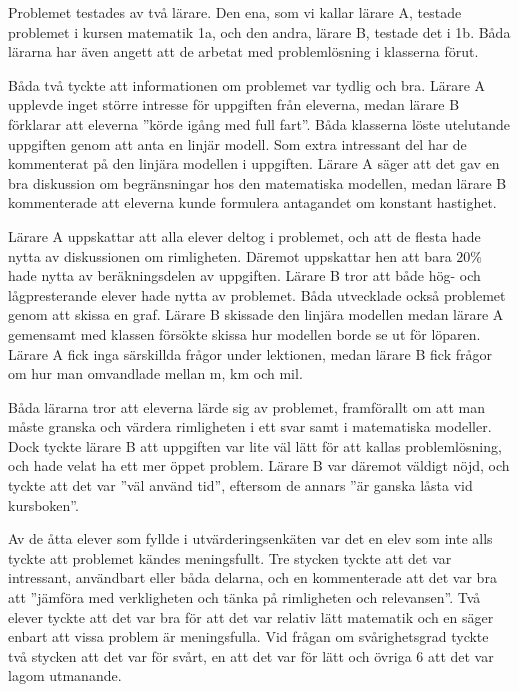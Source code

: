         \textcolor{lila}{Problemet testades av två lärare. Den ena, som vi kallar lärare A, testade problemet i kursen matematik 1a, och den andra, lärare B, testade det i 1b. Båda lärarna har även angett att de arbetat med problemlösning i klasserna förut.}
    
        \textcolor{lila}{Båda två tyckte att informationen om problemet var tydlig och bra. Lärare A upplevde inget större intresse för uppgiften från eleverna, medan lärare B förklarar att eleverna ''körde igång med full fart''. Båda klasserna löste utelutande uppgiften genom att anta en linjär modell. Som extra intressant del har de kommenterat på den linjära modellen i uppgiften. Lärare A säger att det gav en bra diskussion om begränsningar hos den matematiska modellen, medan lärare B kommenterade att eleverna kunde formulera antagandet om konstant hastighet.}
    
        \textcolor{lila}{Lärare A uppskattar att alla elever deltog i problemet, och att de flesta hade nytta av diskussionen om rimligheten. Däremot uppskattar hen att bara $20\%$ hade nytta av beräkningsdelen av uppgiften. Lärare B tror att både hög- och lågpresterande elever hade nytta av problemet. Båda utvecklade också problemet genom att skissa en graf. Lärare B skissade den linjära modellen medan lärare A gemensamt med klassen försökte skissa hur modellen borde se ut för löparen. Lärare A fick inga särskillda frågor under lektionen, medan lärare B fick frågor om hur man omvandlade mellan m, km och mil.}
    
        \textcolor{lila}{Båda lärarna tror att eleverna lärde sig av problemet, framförallt om att man måste granska och värdera rimligheten i ett svar samt i matematiska modeller. Dock tyckte lärare B att uppgiften var lite väl lätt för att kallas problemlösning, och hade velat ha ett mer öppet problem. Lärare B var däremot väldigt nöjd, och tyckte att det var ''väl använd tid'', eftersom de annars ''är ganska låsta vid kursboken''.}
    
        \textcolor{lila}{Av de åtta elever som fyllde i utvärderingsenkäten var det en elev som inte alls tyckte att problemet kändes meningsfullt. Tre stycken tyckte att det var intressant, användbart eller båda delarna, och en kommenterade att det var bra att ''jämföra med verkligheten och tänka på rimligheten och relevansen''. Två elever tyckte att det var bra för att det var relativ lätt matematik och en säger enbart att vissa problem är meningsfulla. 
        Vid frågan om svårighetsgrad tyckte två stycken att det var för svårt, en att det var för lätt och övriga 6 att det var lagom utmanande.}
    
